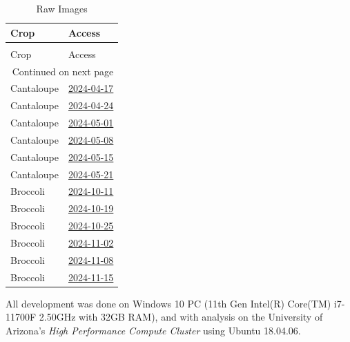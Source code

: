 \documentclass[letterpaper, notitlepage]{report}
\begin{document}
\begin{longtable}{ll}
\caption[Raw Images]{Raw Images}
\label{table:raw-images}\\
\toprule
   Crop & Access  \\
\midrule
\endfirsthead
\caption[]{Raw Images} \\
\toprule
   Crop & Access \\
\midrule
\endhead
\midrule
\multicolumn{2}{r}{{Continued on next page}} \\
\midrule
\endfoot

\bottomrule
\endlastfoot
Cantaloupe & \href{https://mac-cantaloupe.s3.us-west-2.amazonaws.com/2024-04-17.zip}{2024-04-17} \\
Cantaloupe & \href{https://mac-cantaloupe.s3.us-west-2.amazonaws.com/2024-04-24.zip}{2024-04-24} \\
Cantaloupe & \href{https://mac-cantaloupe.s3.us-west-2.amazonaws.com/2024-05-01.zip}{2024-05-01} \\
Cantaloupe & \href{https://mac-cantaloupe.s3.us-west-2.amazonaws.com/2024-05-08.zip}{2024-05-08} \\
Cantaloupe & \href{https://mac-cantaloupe.s3.us-west-2.amazonaws.com/2024-05-15.zip}{2024-05-15} \\
Cantaloupe & \href{https://mac-cantaloupe.s3.us-west-2.amazonaws.com/2024-05-21.zip}{2024-05-21} \\
Broccoli & \href{https://mac-broccoli.s3.us-west-2.amazonaws.com/2024-10-11.zip}{2024-10-11} \\
Broccoli & \href{https://mac-broccoli.s3.us-west-2.amazonaws.com/2024-10-19.zip}{2024-10-19} \\
Broccoli & \href{https://mac-broccoli.s3.us-west-2.amazonaws.com/2024-10-25.zip}{2024-10-25} \\
Broccoli & \href{https://mac-broccoli.s3.us-west-2.amazonaws.com/2024-11-02.zip}{2024-11-02} \\
Broccoli & \href{https://mac-broccoli.s3.us-west-2.amazonaws.com/2024-11-08.zip}{2024-11-08} \\
Broccoli & \href{https://mac-broccoli.s3.us-west-2.amazonaws.com/2024-11-15.zip}{2024-11-15} \\

\end{longtable}



All development was done on Windows 10 PC (11th Gen Intel(R) Core(TM) i7-11700F \@ 2.50GHz with 32GB RAM), and  with analysis on the University of Arizona's \textit{High Performance Compute Cluster} using Ubuntu 18.04.06.
\end{document}
